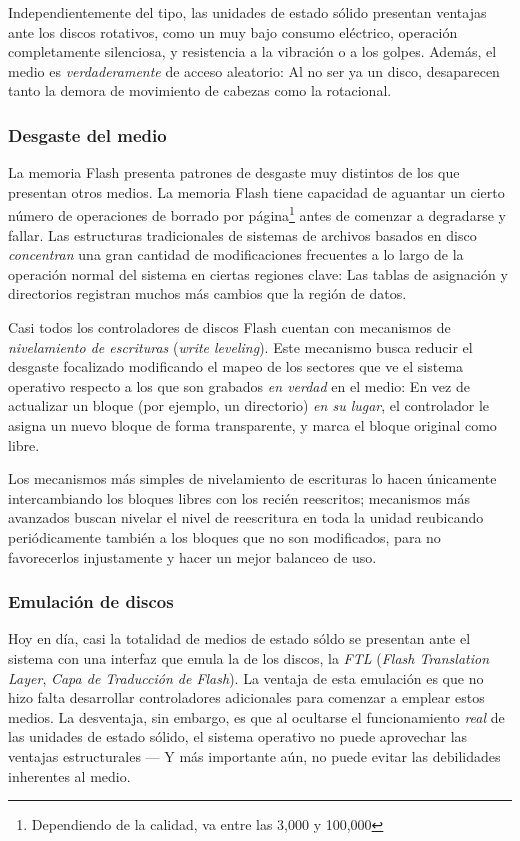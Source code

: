 \documentclass[11pt,fleqn]{book} %
\begin{document}
Independientemente del tipo, las unidades de estado sólido presentan
ventajas ante los discos rotativos, como un muy bajo consumo
eléctrico, operación completamente silenciosa, y resistencia a la
vibración o a los golpes. Además, el medio es \emph{verdaderamente} de
acceso aleatorio: Al no ser ya un disco, desaparecen tanto la demora
de movimiento de cabezas como la rotacional.
\subsubsection{Desgaste del medio}
\label{sec-10-1-2-1}


La memoria Flash presenta patrones de desgaste muy distintos de los que
presentan otros medios. La memoria Flash tiene capacidad de
aguantar un cierto número de operaciones de borrado por página\footnote{Dependiendo de la calidad, va entre las 3,000 y 100,000 } antes de
comenzar a degradarse y fallar. Las
estructuras tradicionales de sistemas de archivos basados en disco
\emph{concentran} una gran cantidad de modificaciones frecuentes a lo largo
de la operación normal del sistema en ciertas regiones
clave: Las tablas de asignación y directorios registran muchos más
cambios que la región de datos.

Casi todos los controladores de discos Flash cuentan con mecanismos de
\emph{nivelamiento de escrituras} (\emph{write leveling}). Este mecanismo busca
reducir el desgaste focalizado modificando el mapeo de los sectores
que ve el sistema operativo respecto a los que son grabados \emph{en verdad} en el medio: En vez de actualizar un bloque (por ejemplo, un
directorio) \emph{en su lugar}, el controlador le asigna un nuevo bloque de
forma transparente, y marca el bloque original como libre.

Los mecanismos más simples de nivelamiento de escrituras lo hacen
únicamente intercambiando los bloques libres con los recién
reescritos; mecanismos más avanzados buscan nivelar el nivel de
reescritura en toda la unidad reubicando periódicamente también a los
bloques que no son modificados, para no favorecerlos injustamente y
hacer un mejor balanceo de uso.
\subsubsection{Emulación de discos}
\label{sec-10-1-2-2}


Hoy en día, casi la totalidad de medios de estado sóldo se presentan
ante el sistema con una interfaz que emula la de los discos, la \emph{FTL}
(\emph{Flash Translation Layer}, \emph{Capa de Traducción de Flash}). La ventaja
de esta emulación es que no hizo falta desarrollar controladores
adicionales para comenzar a emplear estos medios. La desventaja, sin
embargo, es que al ocultarse el funcionamiento \emph{real} de las unidades
de estado sólido, el sistema operativo no puede aprovechar las
ventajas estructurales — Y más importante aún, no puede evitar las
debilidades inherentes al medio.
\end{document}
